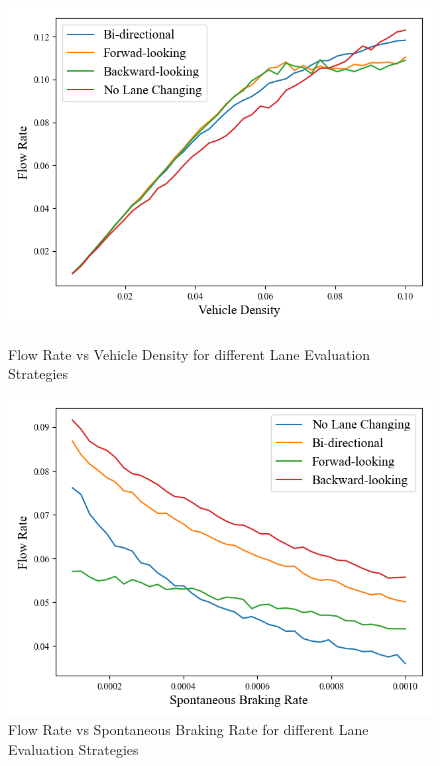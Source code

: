 \documentclass{article}
\begin{document}
\begin{figure}[H]
    \centering
    \begin{minipage}{.5\textwidth}
        \centering
        \includegraphics[width=1\textwidth]{methods-density.png}
        \begin{minipage}{0.8\textwidth}
            \caption{Flow Rate vs Vehicle Density for different Lane Evaluation Strategies}
            \label{fig:lane_strategy_density}
        \end{minipage}
    \end{minipage}\hfill
    \begin{minipage}{.5\textwidth}
        \centering
        \includegraphics[width=1\textwidth]{methods-stop.png}
        \begin{minipage}{0.8\textwidth}
            \caption{Flow Rate vs Spontaneous Braking Rate for different Lane Evaluation Strategies}
            \label{fig:lane_strategy_stop}
        \end{minipage}
    \end{minipage}
\end{figure}
\end{document}
